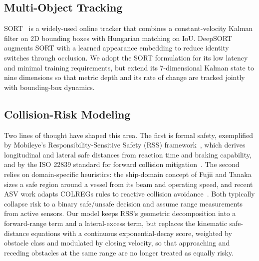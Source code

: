 \subsection{Multi-Object Tracking}

SORT~\cite{bewley2016simple} is a widely-used online tracker that combines a constant-velocity Kalman filter on 2D bounding boxes with Hungarian matching on IoU. DeepSORT~\cite{wojke2017simpleonlinerealtimetracking} augments SORT with a learned appearance embedding to reduce identity switches through occlusion. We adopt the SORT formulation for its low latency and minimal training requirements, but extend its 7-dimensional Kalman state to nine dimensions so that metric depth and its rate of change are tracked jointly with bounding-box dynamics.

\subsection{Collision-Risk Modeling}

Two lines of thought have shaped this area. The first is formal safety, exemplified by Mobileye's Responsibility-Sensitive Safety (RSS) framework~\cite{shalevshwartz2018formalmodelsafescalable}, which derives longitudinal and lateral safe distances from reaction time and braking capability, and by the ISO 22839 standard for forward collision mitigation~\cite{iso22839}. The second relies on domain-specific heuristics: the ship-domain concept of Fujii and Tanaka~\cite{fujii1971traffic} sizes a safe region around a vessel from its beam and operating speed, and recent ASV work adapts COLREGs rules to reactive collision avoidance~\cite{qu2022real}. Both typically collapse risk to a binary safe/unsafe decision and assume range measurements from active sensors. Our model keeps RSS's geometric decomposition into a forward-range term and a lateral-excess term, but replaces the kinematic safe-distance equations with a continuous exponential-decay score, weighted by obstacle class and modulated by closing velocity, so that approaching and receding obstacles at the same range are no longer treated as equally risky.
